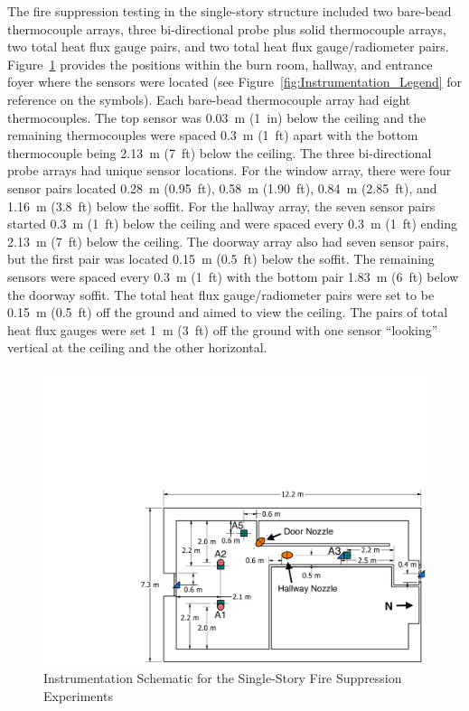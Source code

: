 \documentclass[12pt,oneside]{book}
\begin{document}
The fire suppression testing in the single-story structure included two bare-bead thermocouple arrays, three bi-directional probe plus solid thermocouple arrays, two total heat flux gauge pairs, and two total heat flux gauge/radiometer pairs. Figure~\ref{fig:Fire_Suppression_Instrumentation_Dimensions} provides the positions within the burn room, hallway, and entrance foyer where the sensors were located (see Figure~\ref{fig:Instrumentation_Legend} for reference on the symbols). Each bare-bead thermocouple array had eight thermocouples. The top sensor was 0.03~m (1~in) below the ceiling and the remaining thermocouples were spaced 0.3~m (1~ft) apart with the bottom thermocouple being 2.13~m (7~ft) below the ceiling. The three bi-directional probe arrays had unique sensor locations. For the window array, there were four sensor pairs located 0.28~m (0.95~ft), 0.58~m (1.90~ft), 0.84~m (2.85~ft), and 1.16~m (3.8~ft) below the soffit. For the hallway array, the seven sensor pairs started 0.3~m (1~ft) below the ceiling and were spaced every 0.3~m (1~ft) ending 2.13~m (7~ft) below the ceiling. The doorway array also had seven sensor pairs, but the first pair was located 0.15~m (0.5~ft) below the soffit. The remaining sensors were spaced every 0.3~m (1~ft) with the bottom pair 1.83~m (6~ft) below the doorway soffit. The total heat flux gauge/radiometer pairs were set to be 0.15~m (0.5~ft) off the ground and aimed to view the ceiling. The pairs of total heat flux gauges were set 1~m (3~ft) off the ground with one sensor ``looking'' vertical at the ceiling and the other horizontal.

\begin{figure}[!ht]
	\includegraphics[width=\columnwidth]{../Figures/Floor_Plans/PDFs/East_Structure/DelCo_2012_East_Structure_Instrumentation}
	\caption{Instrumentation Schematic for the Single-Story Fire Suppression Experiments}
	\label{fig:Fire_Suppression_Instrumentation_Dimensions}
\end{figure}
\end{document}
